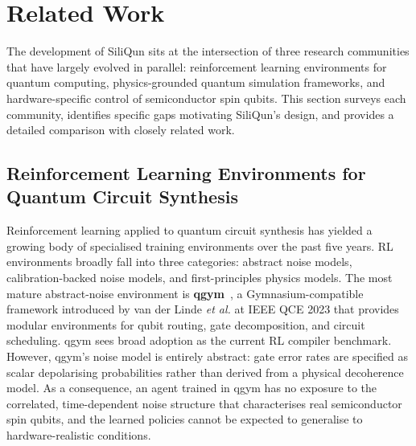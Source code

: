 
\section{Related Work}
\label{sec:related_work}

The development of SiliQun sits at the intersection of three research
communities that have largely evolved in parallel: reinforcement learning
environments for quantum computing, physics-grounded quantum simulation
frameworks, and hardware-specific control of semiconductor spin qubits.
This section surveys each community, identifies specific gaps motivating
SiliQun's design, and provides a detailed comparison with closely related
work.

\subsection{Reinforcement Learning Environments for Quantum Circuit Synthesis}
\label{sec:rw_rl_envs}

Reinforcement learning applied to quantum circuit synthesis has yielded a
growing body of specialised training environments over the past five years. RL environments broadly fall into three categories: abstract noise models, calibration-backed noise models, and first-principles physics models. The most mature abstract-noise environment is \textbf{qgym}~\cite{vanderLinde2023qgym},
a Gymnasium-compatible framework introduced by van der Linde \emph{et al.}
at IEEE QCE 2023 that provides modular environments for qubit routing, gate
decomposition, and circuit scheduling. qgym sees broad adoption as the current RL compiler benchmark. However, qgym's noise model is
entirely abstract: gate error rates are specified as scalar depolarising
probabilities rather than derived from a physical decoherence model. As a
consequence, an agent trained in qgym has no exposure to the correlated,
time-dependent noise structure that characterises real semiconductor spin
qubits, and the learned policies cannot be expected to generalise to
hardware-realistic conditions.

